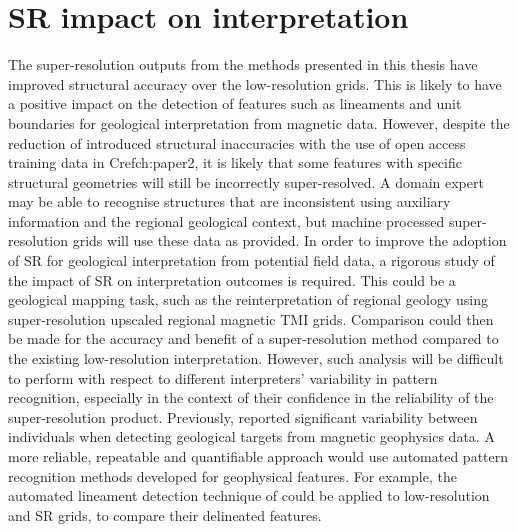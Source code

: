 \section{SR impact on interpretation}
The super-resolution outputs from the methods presented in this thesis have improved structural accuracy over the low-resolution grids.
This is likely to have a positive impact on the detection of features such as lineaments and unit boundaries for geological interpretation from magnetic data.
However, despite the reduction of introduced structural inaccuracies with the use of open access training data in Cref{ch:paper2}, it is likely that some features with specific structural geometries will still be incorrectly super-resolved.
A domain expert may be able to recognise structures that are inconsistent using auxiliary information and the regional geological context, but machine processed super-resolution grids will use these data as provided.
In order to improve the adoption of SR for geological interpretation from potential field data, a rigorous study of the impact of SR on interpretation outcomes is required.
This could be a geological mapping task, such as the reinterpretation of regional geology using super-resolution upscaled regional magnetic TMI grids.
Comparison could then be made for the accuracy and benefit of a super-resolution method compared to the existing low-resolution interpretation.
However, such analysis will be difficult to perform with respect to different interpreters' variability in pattern recognition, especially in the context of their confidence in the reliability of the super-resolution product.
Previously, \textcite{sivarajahIdentifyingEffectiveInterpretation2013} reported significant variability between individuals when detecting geological targets from magnetic geophysics data.
A more reliable, repeatable and quantifiable approach would use automated pattern recognition methods developed for geophysical features.
For example, the automated lineament detection technique of \textcite{holdenAutomaticIdentificationResponses2011,holdenAutomatedAnalysisRegional2008} could be applied to low-resolution and SR grids, to compare their delineated features.

